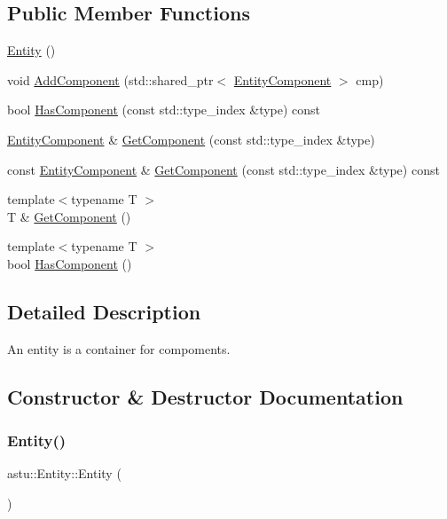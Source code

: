 \subsection*{Public Member Functions}
\begin{DoxyCompactItemize}
\item 
\hyperlink{classastu_1_1Entity_aed9aac4a995b5c044c0301302f2bd3d0}{Entity} ()
\item 
void \hyperlink{classastu_1_1Entity_ab8f47f4de88139f9202466b726e61aee}{Add\+Component} (std\+::shared\+\_\+ptr$<$ \hyperlink{classastu_1_1EntityComponent}{Entity\+Component} $>$ cmp)
\item 
bool \hyperlink{classastu_1_1Entity_ad1ee4a4e617de7c40eb252413b9045a1}{Has\+Component} (const std\+::type\+\_\+index \&type) const
\item 
\hyperlink{classastu_1_1EntityComponent}{Entity\+Component} \& \hyperlink{classastu_1_1Entity_a3d9bb583859f1a941fdaad76f5093323}{Get\+Component} (const std\+::type\+\_\+index \&type)
\item 
const \hyperlink{classastu_1_1EntityComponent}{Entity\+Component} \& \hyperlink{classastu_1_1Entity_affe49f8c35d5b067f06803e27243189a}{Get\+Component} (const std\+::type\+\_\+index \&type) const
\item 
{\footnotesize template$<$typename T $>$ }\\T \& \hyperlink{classastu_1_1Entity_aeabb500a719de29039dd0fad4ea553c4}{Get\+Component} ()
\item 
{\footnotesize template$<$typename T $>$ }\\bool \hyperlink{classastu_1_1Entity_a80b75df1873d23f79f050bc6a178cd4c}{Has\+Component} ()
\end{DoxyCompactItemize}


\subsection{Detailed Description}
An entity is a container for compoments. 

\subsection{Constructor \& Destructor Documentation}
\mbox{\label{classastu_1_1Entity_aed9aac4a995b5c044c0301302f2bd3d0}} 
\subsubsection{\texorpdfstring{Entity()}{Entity()}}
{\footnotesize\ttfamily astu\+::\+Entity\+::\+Entity (\begin{DoxyParamCaption}{ }\end{DoxyParamCaption})\hspace{0.3cm}{\ttfamily [inline]}}

